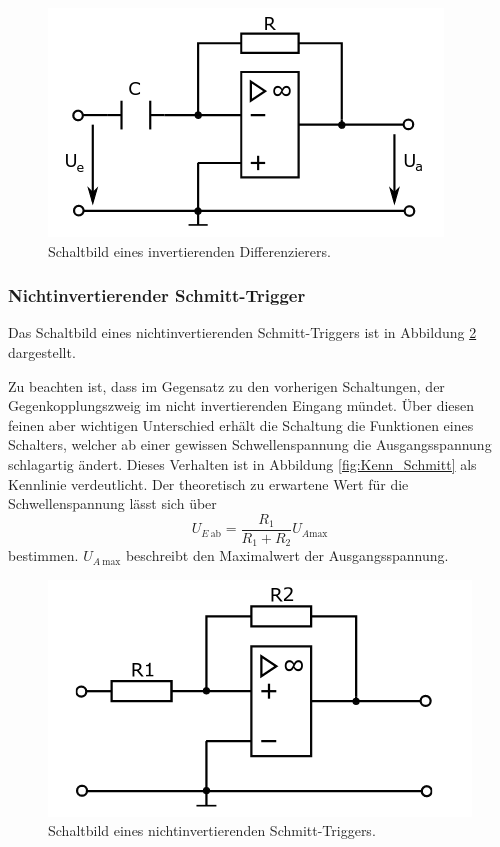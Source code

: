 \begin{figure}
    \centering 
    \includegraphics[width=.5\textwidth]{Bilder/Inv_Dif.png}
    \caption{Schaltbild eines invertierenden Differenzierers.}
    \label{fig:Inv_Dif}
\end{figure}


\subsubsection{Nichtinvertierender Schmitt-Trigger}

Das Schaltbild eines nichtinvertierenden Schmitt-Triggers ist in Abbildung \ref{fig:Schmitt} dargestellt.

Zu beachten ist, dass im Gegensatz zu den vorherigen Schaltungen, der Gegenkopplungszweig im nicht invertierenden Eingang mündet.
Über diesen feinen aber wichtigen Unterschied erhält die Schaltung die Funktionen eines Schalters, welcher ab einer gewissen Schwellenspannung die Ausgangsspannung schlagartig ändert.
Dieses Verhalten ist in Abbildung \ref{fig:Kenn_Schmitt} als Kennlinie verdeutlicht.
Der theoretisch zu erwartene Wert für die Schwellenspannung lässt sich über
\begin{equation}
    U_{E \: \text{ab}} = \frac{R_1}{R_1+R_2} U_{A\text{max}}
\end{equation}
bestimmen.
$U_{A \: \text{max}}$ beschreibt den Maximalwert der Ausgangsspannung.

\begin{figure}
    \centering 
    \includegraphics[width=.5\textwidth]{Bilder/Schmitt.png}
    \caption{Schaltbild eines nichtinvertierenden Schmitt-Triggers.}
    \label{fig:Schmitt}
\end{figure}

